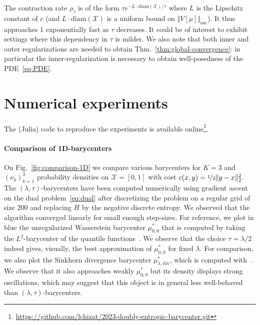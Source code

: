 \documentclass[11pt]{article}
\newcommand{\Xx}{\mathcal{X}}
\begin{document}
The contraction rate $\rho_\tau$ is of the form $\tau e^{-L\cdot \mathrm{diam}(\Xx)/\tau}$ where $L$ is the Lipschitz constant of $c$ (and $L\cdot \mathrm{diam}(\Xx)$ is a uniform bound on $\Vert V[\mu]\Vert_{\mathrm{osc}}$). It thus approaches $1$ exponentially fast as $\tau$ decreases. It could be of interest to exhibit settings where this dependency in $\tau$ is milder. We also note that both inner and outer regularizations are needed to obtain Thm.~\ref{thm:global-convergence}: in particular the inner-regularization is necessary to obtain well-posedness of the PDE~\eqref{eq:PDE}.

\section{Numerical experiments}\label{sec:numerics}
The (Julia) code to reproduce the experiments is available online\footnote{\url{https://github.com/lchizat/2023-doubly-entropic-barycenter.git}}.

\paragraph{Comparison of 1D-barycenters} On Fig.~\ref{fig:comparison-1D} we compare various barycenters for $K=3$ and $(\nu_k)_{k=1}^3$ probability densities on $\Xx=[0,1]$ with cost $c(x,y)=\nicefrac12 \Vert y-x\Vert^2_2$. The $(\lambda,\tau)$-barycenters have been computed numerically using gradient ascent on the dual problem~\eqref{eq:dual} after discretizing the problem on a regular grid of size $200$ and replacing $H$ by the negative discrete entropy. We observed that the algorithm converged linearly for small enough step-sizes. For reference, we plot in blue the unregularized Wasserstein barycenter $\mu^*_{0,0}$ that is computed by taking the $L^2$-barycenter of the quantile functions~\cite[Chap.~2]{santambrogio2015optimal}. We observe that the choice $\tau=\lambda/2$ indeed gives, visually, the best approximation of $\mu^*_{0,0}$ for fixed $\lambda$. For comparison, we also plot the Sinkhorn divergence barycenter $\mu^*_{\lambda,\mathrm{div}}$, which is computed with~\cite[Alg.~1]{janati2020debiased}. We observe that it also approaches weakly $\mu^*_{0,0}$ but its density displays strong oscillations, which may suggest that this object is in general less well-behaved than $(\lambda,\tau)$-barycenters.
\end{document}

